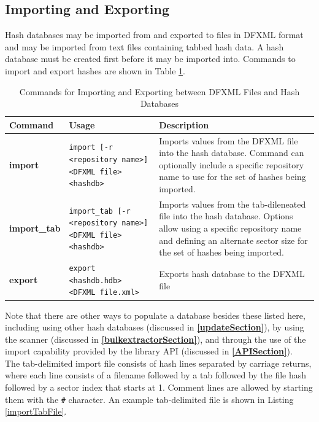 \documentclass[11pt,fleqn]{article} %
\begin{document}
\subsection{Importing and Exporting}
Hash databases may be imported from and exported to files in DFXML format
and may be imported from text files containing tabbed hash data.
A hash database must be created first before it may be imported into.
Commands to import and export hashes are shown in Table \ref{tab:importExport}.\\
\begin{table}[!ht]
\centering
\caption{Commands for Importing and Exporting between DFXML Files and Hash Databases}
\label{tab:importExport}
\begin{tabular}{|p{2.5 cm}|p{7 cm}|p{4 cm}|}
\hline \hline
\textbf{Command} & \textbf{Usage} & \textbf{Description} \\
\hline
\textbf{import} & \verb+import [-r <repository name>]+ \verb+<DFXML file> <hashdb>+& Imports values from the DFXML file into the hash database. Command can optionally include a specific repository name to use for the set of hashes being imported.\\
\hline
\textbf{import\_tab} & \verb+import_tab [-r <repository name>]+ \verb+<DFXML file> <hashdb>+& Imports values from the tab-dileneated file into the hash database. Options allow using a specific repository name and defining an alternate sector size for the set of hashes being imported.\\
\hline
\textbf{export} & \verb+export <hashdb.hdb> <DFXML file.xml>+ & Exports hash database to the DFXML file\\
\hline
\end{tabular}
\end{table}
Note that there are other ways to populate a database besides these listed here, including using other hash databases (discussed in \textbf{\autoref{updateSection}}),
by using the \bulk \hash scanner (discussed in \textbf{\autoref{bulkextractorSection}}),
and through the use of the import capability provided by the \hdb library API (discussed in \textbf{\autoref{APISection}}).\\

The tab-delimited import file consists of hash lines separated by carriage returns, where each line consists of a filename followed by a tab followed by the file hash followed by a sector index that starts at 1.  Comment lines are allowed by starting them with the \texttt{\#} character.
An example tab-delimited file is shown in Listing \ref{importTabFile}.
\end{document}

